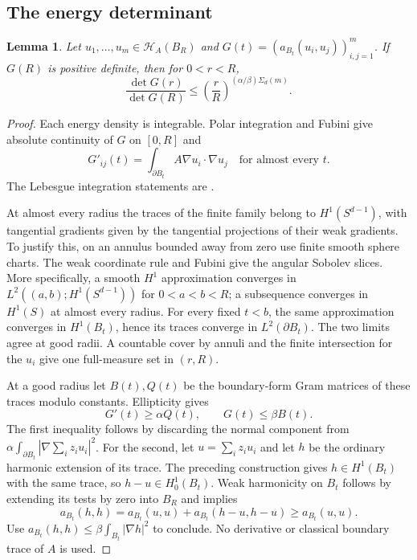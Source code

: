 \documentclass[11pt]{article}
\newtheorem{lemma}[theorem]{Lemma}
\theoremstyle{remark}
\newcommand{\Ha}{\mathcal H_A}
\begin{document}
\subsection{The energy determinant}
\begin{lemma}\label{lem:det}
Let $u_1,\ldots,u_m\in\Ha(B_R)$ and
$G(t)=(a_{B_t}(u_i,u_j))_{i,j=1}^m$. If $G(R)$ is positive definite,
then for $0<r<R$,
\begin{equation}\label{eq:det}
 \frac{\det G(r)}{\det G(R)}
       \le\left(\frac rR\right)^{(\alpha/\beta)\Sigma_d(m)}.
\end{equation}
\end{lemma}
\begin{proof}
Each energy density is integrable. Polar integration and Fubini give
absolute continuity of $G$ on $[0,R]$ and
\begin{equation}\label{eq:gramderivative}
 G'_{ij}(t)=\int_{\partial B_t}A\nabla u_i\cdot\nabla u_j
 \quad\text{for almost every }t.
\end{equation}
The Lebesgue integration statements are
\cite[Theorems 1.47 and 2.2]{GuermondNotes}.

At almost every radius the traces of the finite family belong to
$H^1(S^{d-1})$, with tangential gradients given by the tangential
projections of their weak gradients. To justify this, on an annulus
bounded away from zero use finite smooth sphere charts. The weak
coordinate rule \cite[Corollary 2.25]{GuermondNotes} and Fubini give
the angular Sobolev slices. More specifically, a smooth $H^1$ approximation
converges in $L^2((a,b);H^1(S^{d-1}))$ for $0<a<b<R$;
a subsequence converges in $H^1(S)$ at almost every radius.
For every fixed $t<b$, the same approximation converges in $H^1(B_t)$,
hence its traces converge in $L^2(\partial B_t)$. The two limits agree
at good radii. A countable cover by annuli and the finite intersection
for the $u_i$ give one full-measure set in $(r,R)$.

At a good radius let $B(t),Q(t)$ be the boundary-form Gram matrices of
these traces modulo constants. Ellipticity gives
\begin{equation}\label{eq:matrixbounds}
 G'(t)\ge\alpha Q(t),\qquad G(t)\le\beta B(t).
\end{equation}
The first inequality follows by discarding the normal component from
$\alpha\int_{\partial B_t}|\nabla\sum_i z_i u_i|^2$.
For the second, let $u=\sum_i z_i u_i$ and let $h$ be the ordinary
harmonic extension of its trace. The preceding construction gives
$h\in H^1(B_t)$ with the same trace, so $h-u\in H^1_0(B_t)$.
Weak harmonicity on $B_t$ follows by extending its tests by zero into
$B_R$ and implies
\[
 a_{B_t}(h,h)=a_{B_t}(u,u)+a_{B_t}(h-u,h-u)\ge a_{B_t}(u,u).
\]
Use $a_{B_t}(h,h)\le\beta\int_{B_t}|\nabla h|^2$ to conclude.
No derivative or classical boundary trace of $A$ is used.


\end{proof}
\end{document}
